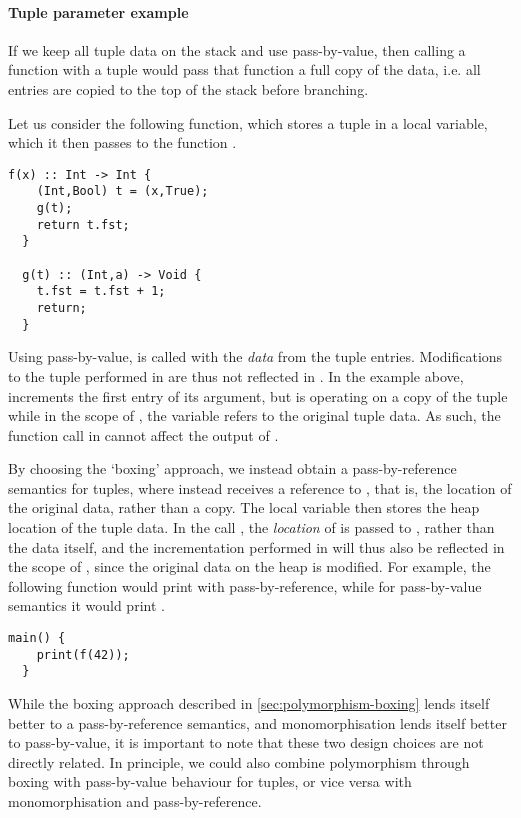 \paragraph{Tuple parameter example}
If we keep all tuple data on the stack and use pass-by-value, then calling a
function with a tuple would pass that function a full copy of the data, i.e. all
entries are copied to the top of the stack before branching.

Let us consider the following function, which stores a tuple in a local
variable, which it then passes to the function .
%
\begin{lstlisting}[language=spl]
  f(x) :: Int -> Int {
    (Int,Bool) t = (x,True);
    g(t);
    return t.fst;
  }

  g(t) :: (Int,a) -> Void {
    t.fst = t.fst + 1;
    return;
  }
\end{lstlisting}
%
Using pass-by-value,  is called with the \emph{data} from the tuple
entries. Modifications to the tuple performed in  are thus not reflected
in . In the example above,  increments the first entry of its
argument, but  is operating on a copy of the tuple while in the scope of
, the variable  refers to the original tuple data. As such, the
function call  in  cannot affect the output of .

By choosing the `boxing' approach, we instead obtain a pass-by-reference
semantics for tuples, where  instead receives a reference to ,
that is, the location of the original data, rather than a copy.
The local variable  then stores the heap location of the tuple data. In
the call , the \emph{location} of  is passed to , rather
than the data itself, and the incrementation performed in  will thus also
be reflected in the scope of , since the original data on the heap is
modified. For example, the following  function would print 
with pass-by-reference, while for pass-by-value semantics it would print
.
%
\begin{lstlisting}[language=spl]
  main() {
    print(f(42));
  }
\end{lstlisting}

While the boxing approach described in \cref{sec:polymorphism-boxing} lends
itself better to a pass-by-reference semantics, and monomorphisation lends
itself better to pass-by-value, it is important to note that these two design
choices are not directly related.
In principle, we could also combine polymorphism through boxing with
pass-by-value behaviour for tuples, or vice versa with monomorphisation and
pass-by-reference.

